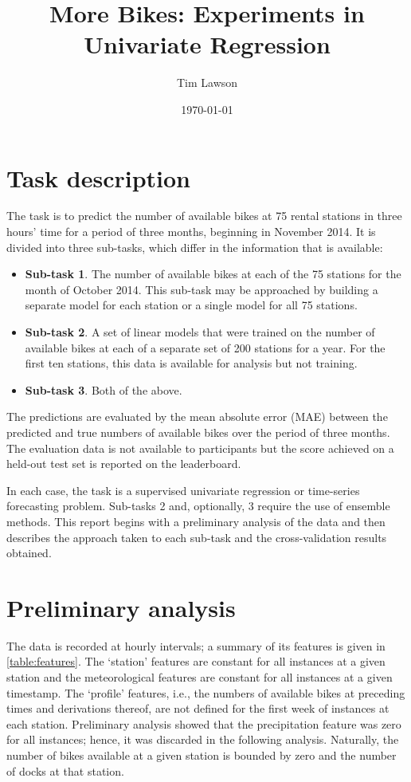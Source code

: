 \documentclass[11pt]{extarticle}
\begin{document}
\title{More Bikes: Experiments in Univariate Regression}
\author{Tim Lawson}
\date{\today}

\maketitle

\section{Task description}

The task is to predict the number of available bikes at 75 rental stations in three
hours' time for a period of three months, beginning in November 2014.
It is divided into three sub-tasks, which differ in the information that is available:
\begin{itemize}
  \item \textbf{Sub-task 1}.
        The number of available bikes at each of the 75 stations for the month of October 2014.
        This sub-task may be approached by building a separate model for each station or a
        single model for all 75 stations.
  \item \textbf{Sub-task 2}.
        A set of linear models that were trained on the number of available bikes at each of a
        separate set of 200 stations for a year.
        For the first ten stations, this data is available for analysis but not training.
  \item \textbf{Sub-task 3}.
        Both of the above.
\end{itemize}
The predictions are evaluated by the mean absolute error (MAE) between the predicted
and true numbers of available bikes over the period of three months.
The evaluation data is not available to participants but the score achieved on a
held-out test set is reported on the leaderboard.

In each case, the task is a supervised univariate regression or time-series forecasting
problem.
Sub-tasks 2 and, optionally, 3 require the use of ensemble methods.
This report begins with a preliminary analysis of the data and then describes the
approach taken to each sub-task and the cross-validation results obtained.

\section{Preliminary analysis}

The data is recorded at hourly intervals; a summary of its features is given in
\cref{table:features}.
The `station' features are constant for all instances at a given station and the
meteorological features are constant for all instances at a given timestamp.
The `profile' features, i.e., the numbers of available bikes at preceding times and
derivations thereof, are not defined for the first week of instances at each station.
Preliminary analysis showed that the precipitation feature was zero for all instances;
hence, it was discarded in the following analysis.
Naturally, the number of bikes available at a given station is bounded by zero and the
number of docks at that station.
\end{document}

